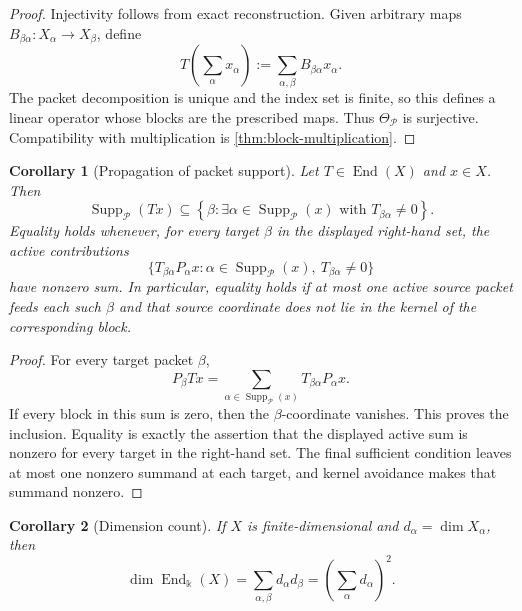 \documentclass[11pt]{article}
\newtheorem{corollary}[corollary]{Corollary}
\theoremstyle{definition}
\theoremstyle{remark}
\theoremstyle{definition}\newtheorem{example}[theorem]{Example}
\newcommand{\bbk}{\Bbbk}
\newcommand{\Pcal}{\mathcal P}
\newcommand{\End}{\operatorname{End}}
\newcommand{\Supp}{\operatorname{Supp}}
\newcommand{\RecordID}[1]{\label{record:#1}}
\newcommand{\Depends}[1]{}
\newcommand{\Exports}[1]{}
\begin{document}
\begin{proof}
Injectivity follows from exact reconstruction.  Given arbitrary maps $B_{\beta\alpha}:X_\alpha\to X_\beta$, define
\[
T\left(\sum_\alpha x_\alpha\right)
:=
\sum_{\alpha,\beta}B_{\beta\alpha}x_\alpha.
\]
The packet decomposition is unique and the index set is finite, so this defines a linear operator whose blocks are the prescribed maps.  Thus $\Theta_{\Pcal}$ is surjective.  Compatibility with multiplication is \cref{thm:block-multiplication}.
\end{proof}



\begin{corollary}[Propagation of packet support]
\label{cor:packet-support-propagation}
Let \(T\in\End(X)\) and \(x\in X\).  Then
\[
\boxed{
\Supp_{\Pcal}(Tx)
\subseteq
\left\{\beta:\exists\alpha\in\Supp_{\Pcal}(x)
\text{ with }T_{\beta\alpha}\neq0\right\}.
}
\]
Equality holds whenever, for every target \(\beta\) in the displayed right-hand set, the active contributions
\[
\bigl\{T_{\beta\alpha}P_\alpha x:
\alpha\in\Supp_{\Pcal}(x),\ T_{\beta\alpha}\neq0\bigr\}
\]
have nonzero sum.  In particular, equality holds if at most one active source packet feeds each such \(\beta\) and that source coordinate does not lie in the kernel of the corresponding block.
\end{corollary}
\RecordID{PSC-I-C-PACKET-SUPPORT-PROPAGATION}
\Depends{PSC-I-D-PACKET-SUPPORT and PSC-I-T-OPERATOR-RECONSTRUCTION.}
\Exports{Graph reachability, leakage bounds, and support pruning.}

\begin{proof}
For every target packet \(\beta\),
\[
P_\beta Tx
=
\sum_{\alpha\in\Supp_{\Pcal}(x)}T_{\beta\alpha}P_\alpha x.
\]
If every block in this sum is zero, then the \(\beta\)-coordinate vanishes.  This proves the inclusion.  Equality is exactly the assertion that the displayed active sum is nonzero for every target in the right-hand set.  The final sufficient condition leaves at most one nonzero summand at each target, and kernel avoidance makes that summand nonzero.
\end{proof}


\begin{corollary}[Dimension count]
\label{cor:dimension-count}
If $X$ is finite-dimensional and $d_\alpha=\dim X_\alpha$, then
\[
\dim\End_{\bbk}(X)
=
\sum_{\alpha,\beta}d_\alpha d_\beta
=
\left(\sum_\alpha d_\alpha\right)^2.
\]
\end{corollary}
\RecordID{PSC-I-C-DIMENSION-COUNT}
\Depends{PSC-I-T-BLOCK-ALGEBRA.}
\end{document}
